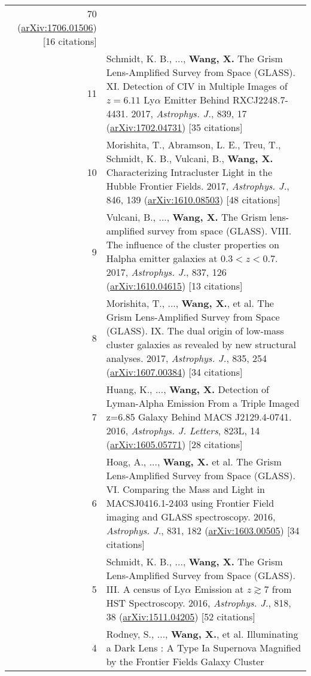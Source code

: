 \documentclass[letterpaper,12pt]{article}
\begin{document}
\begin{longtable}{rp{5.8in}}
    70 (\href{https://arxiv.org/abs/1706.01506}{arXiv:1706.01506}) [16 citations]  \\
11  &   Schmidt, K. B., ..., \textbf{Wang, X.} The Grism Lens-Amplified Survey from Space (GLASS). XI. Detection of CIV in Multiple Images of $z=6.11$ 
    Ly$\alpha$ Emitter Behind RXCJ2248.7-4431. 2017, \textit{Astrophys. J.}, 839, 17 (\href{https://arxiv.org/abs/1702.04731}{arXiv:1702.04731}) [35 citations] \\
10  &   Morishita, T., Abramson, L. E., Treu, T., Schmidt, K. B., Vulcani, B., \textbf{Wang, X.} Characterizing Intracluster Light in the Hubble 
    Frontier Fields. 2017, \textit{Astrophys. J.}, 846, 139 (\href{https://arxiv.org/abs/1610.08503}{arXiv:1610.08503}) [48 citations] \\
9   &   Vulcani, B., ..., \textbf{Wang, X.} The Grism lens-amplified survey from space (GLASS). VIII. The influence of the cluster properties on 
    Halpha emitter galaxies at $0.3<z<0.7$. 2017, \textit{Astrophys. J.}, 837, 126 (\href{https://arxiv.org/abs/1610.04615}{arXiv:1610.04615}) [13 citations]  \\
8   &   Morishita, T., ..., \textbf{Wang, X.}, et al. The Grism Lens-Amplified Survey from Space (GLASS). IX. The dual origin of low-mass cluster 
    galaxies as revealed by new structural analyses. 2017, \textit{Astrophys. J.}, 835, 254 (\href{https://arxiv.org/abs/1607.00384}{arXiv:1607.00384}) 
    [34 citations]  \\
7   &   Huang, K., ..., \textbf{Wang, X.} Detection of Lyman-Alpha Emission From a Triple Imaged z=6.85 Galaxy Behind MACS J2129.4-0741. 2016, 
\textit{Astrophys. J. Letters}, 823L, 14 (\href{https://arxiv.org/abs/1605.05771}{arXiv:1605.05771}) [28 citations]   \\
6   &   Hoag, A., ..., \textbf{Wang, X.} et al. The Grism Lens-Amplified Survey from Space (GLASS). VI. Comparing the Mass and Light in 
MACSJ0416.1-2403 using Frontier Field imaging and GLASS spectroscopy. 2016, \textit{Astrophys. J.}, 831, 182 (\href{https://arxiv.org/abs/1603.00505}
{arXiv:1603.00505}) [34 citations]   \\
5   &   Schmidt, K. B., ..., \textbf{Wang, X.} The Grism Lens-Amplified Survey from Space (GLASS). III. A census of Ly$\alpha$ Emission at $z\gtrsim$7 
from HST Spectroscopy. 2016, \textit{Astrophys. J.}, 818, 38 (\href{https://arxiv.org/abs/1511.04205}{arXiv:1511.04205}) [52 citations] \\
4   &   Rodney, S., ..., \textbf{Wang, X.}, et al. Illuminating a Dark Lens : A Type Ia Supernova Magnified by the Frontier Fields Galaxy Cluster 

\end{longtable}
\end{document}
